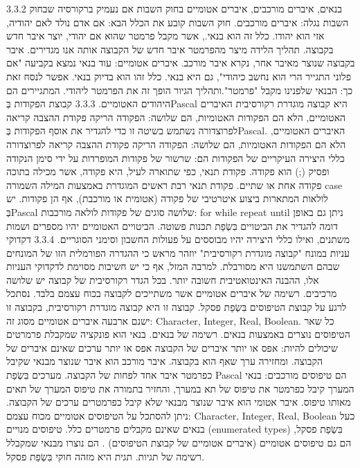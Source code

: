 3.3.2​ בנאים, איברים מורכבים, איברים אטומיים בחוק השבות
אם נעמיק ברקורסיה שבחוק השבות נגלה:
איברים מורכבים. חוק השבות קובע את הכלל הבא: אם אדם נולד לאם יהודיה, אזי הוא יהודו. כלל זה הוא בנאי., אשר מקבל פרמטר שהוא אם יהודי, יוצר איבר חדש בקבוצה. תהליך הלידה מיצר מהפרמטר איבר חדש של הקבוצה אותה אנו מגדירים. איבר בקבוצה שנוצר מאיבר אחר, נקרא איבר מורכב.
איברים אטומיים: עוד בנאי נמצא בקביעה "אם פלוני התגייר הרי הוא נחשב כיהודי", גם היא בנאי. כלל זהו הוא בדיוק בנאי. אפשר לנסח זאת כך: הבנאי שלפנינו מקבל "פרמטר".ותהליך הגיור הופך זה את הפרמטר ליהודי. המתגיירים הם היהודים האטומיים.
​3.3.3​ קבוצת הפקודות בְּPascal היא קבוצה מוגדרת רקורסיבית
האיברים האטומיים, הלא הם הפקודות האטומיות, הם שלושה:
הפקודה הריקה
פקודת ההצבה
קריאה לפרוצדורה
נשתמש בשיטה זו כדי להגדיר את אוסף הפקודות בְּPascal. האיברים האטומיים, הלא הם הפקודות האטומיות, הם שלושה:
הפקודה הריקה
פקודת ההצבה
קריאה לפרוצדורה
כללי היצירה העיקריים של הפקודות הם:
שרשור של פקודות המופרדות על ידי סימן הנקודה ופסיק (;) הוא פקודה.
פקודת תנאי, כפי שתוארה לעיל, היא פקודה, אשר מכילה בתוכה פקודה אחת או שתיים.
פקודת תנאי רבת ראשים המוגדרת באמצעות המילה השמורה case
לולאות המתארות ביצוע איטרטיבי של פקודה (אטומית או מורכבת), אף הן פקודות. יש בְּPascal שלושה סוגים של פקודות לולאה מורכבות:
for
while
repeat until
ניתן גם באופן דומה להגדיר את הביטויים בִּשְׂפַת תכנות פשוטה. הביטויים האטומיים יהיו מספרים ושמות משתנים, ואילו כללי היצירה יהיו מבוססים על פעולות החשבון וסימני הסוגריים.
​3.3.4​ דקדוקי עניות במונח "קבוצה מוגדרת רקורסיבית"
יוזהר מראש כי ההגדרה הפורמלית הזו של המונחים שבהם השתמשנו היא מסורבלת. למרבה המזל, אף כי יש חשיבות מסוימת לדקדוקי העניות אלו, ההבנה האינטואטיבית חשובה יותר.
בכל הגדר רקורסיבית של קבוצה יש שלושה מרכיבים.
רשימה של איברים אטומיים אשר משתייכים לקבוצה בכוח עצמם בלבד.
נסתכל לרגע על קבוצת הטיפוסים בִּשְׂפַת פסקל. קבוצה זו היא קבוצה מוגדרת רקורסיבית, בקבוצה זו ישנם ארבעה איברים אטומיים מסוג זה: Character, Integer, Real, Boolean. כל שאר הטיפוסים נוצרים באמצעות בנאים.
רשימה של בנאים.
בנאי הוא פונקציה שמקבלת פרמרטים שיכולים להיות:
אפס או יותר איברים של הקבוצה
אפס או יותר ערכים שאינם איברים של הקבוצה.
ומחזירה ערך שאף הוא בקבוצה.
איבר מורכב הוא איבר שנוצר מבנאי שקיבל כפרמטר איבר אחד לפחות של הקבוצה.
מערכים בִּשְׂפַת Pascal הם טיפוסים מורכבים: בנאי המערך קיבל כפרמטר את טיפוס של תא במערך, והחזיר בתמורה את טיפוס המערך של תאים מאותו טיפוס.
איבר אטומי הוא איבר שנוצר מבנאי שלא קיבל כפרמטרים ערכים של הקבוצה.
ניתן להסתכל על הטיפוסים אטומיים מכוח עצמם: Character, Integer, Real, Boolean כעל בנאים שאינם מקבלים פרמטרים כלל.
טיפוסים מנויים (enumerated types) בִּשְׂפַת פסקל, הם גם טיפוסים אטומיים (איברים אטומיים של קבוצת הטיפוסים) . הם נוצרו מבנאי שמקבלל רשימה של תגיות. תגית היא מזהה חוקי בִּשְׂפַת פסקל.
